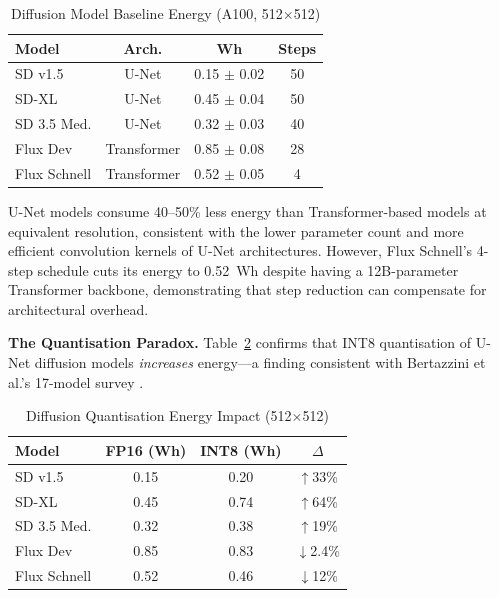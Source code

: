 \documentclass[AMS,STIX2COL]{WileyNJD-v2}
\begin{document}
\begin{table}[h]
\caption{Diffusion Model Baseline Energy (A100, 512$\times$512)}\label{tab:diff_baseline}
\centering
\begin{tabular}{lccc}
\toprule
\textbf{Model} & \textbf{Arch.} & \textbf{Wh} & \textbf{Steps} \\
\midrule
SD v1.5       & U-Net       & 0.15 $\pm$ 0.02 & 50 \\
SD-XL         & U-Net       & 0.45 $\pm$ 0.04 & 50 \\
SD 3.5 Med.   & U-Net       & 0.32 $\pm$ 0.03 & 40 \\
Flux Dev      & Transformer & 0.85 $\pm$ 0.08 & 28 \\
Flux Schnell  & Transformer & 0.52 $\pm$ 0.05 & 4 \\
\bottomrule
\end{tabular}
\end{table}

U-Net models consume 40--50\% less energy than Transformer-based models at equivalent resolution, consistent with the lower parameter count and more efficient convolution kernels of U-Net architectures. However, Flux Schnell's 4-step schedule cuts its energy to 0.52~Wh despite having a 12B-parameter Transformer backbone, demonstrating that step reduction can compensate for architectural overhead.

\textbf{The Quantisation Paradox.} Table~\ref{tab:diff_quant} confirms that INT8 quantisation of U-Net diffusion models \textit{increases} energy---a finding consistent with Bertazzini et al.'s 17-model survey \cite{bertazzini2025hidden}.

\begin{table}[h]
\caption{Diffusion Quantisation Energy Impact (512$\times$512)}\label{tab:diff_quant}
\centering
\begin{tabular}{lccc}
\toprule
\textbf{Model} & \textbf{FP16 (Wh)} & \textbf{INT8 (Wh)} & \textbf{$\Delta$} \\
\midrule
SD v1.5      & 0.15 & 0.20 & $\uparrow$33\% \\
SD-XL        & 0.45 & 0.74 & $\uparrow$64\% \\
SD 3.5 Med.  & 0.32 & 0.38 & $\uparrow$19\% \\
Flux Dev     & 0.85 & 0.83 & $\downarrow$2.4\% \\
Flux Schnell & 0.52 & 0.46 & $\downarrow$12\% \\
\bottomrule
\end{tabular}
\end{table}
\end{document}
